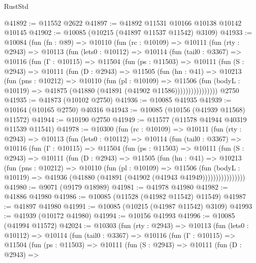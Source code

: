 \begin{lexlean}{RustStd}
\begin{coremodule}
@41892 := @11552 @2622
@41897 := @41892 @11531 @10166 @10138 @10142 @10145
@41902 := @10085 (@10215 (@41897 @11537 @11542) @3109)
@41933 := @10084
    (fun (fn : @89) =>
    @10110
      (fun (rc : @10109) =>
      @10111
        (fun (rty : @2943) =>
        @10113
          (fun (lets0 : @10112) =>
          @10114
            (fun (tail0 : @3367) =>
            @10116
              (fun (Γ : @10115) =>
              @11504
                (fun (ps : @11503) =>
                @10111
                  (fun (S : @2943) =>
                  @10111
                    (fun (D : @2943) =>
                    @11505
                      (fun (hn : @41) =>
                      @10213
                        (fun (pns : @10212) =>
                        @10110
                          (fun (pl : @10109) =>
                          @11506
                            (fun (bodyL : @10119) =>
                            @41875 (@41880 (@41891 (@41902 @11586))))))))))))))))
    @2750
@41935 := @41873 (@10102 @2750)
@41936 := @10085 @41935
@41939 := @10164 (@10165 @2750) @40316
@41943 := @10085 (@10156 (@41939 @11568) @11572)
@41944 := @10190 @2750
@41949 := @11577 (@11578 @41944 @40319 @11539 @11541)
@41978 := @10300
    (fun (rc : @10109) =>
    @10111
      (fun (rty : @2943) =>
      @10113
        (fun (lets0 : @10112) =>
        @10114
          (fun (tail0 : @3367) =>
          @10116
            (fun (Γ : @10115) =>
            @11504
              (fun (ps : @11503) =>
              @10111
                (fun (S : @2943) =>
                @10111
                  (fun (D : @2943) =>
                  @11505
                    (fun (hn : @41) =>
                    @10213
                      (fun (pns : @10212) =>
                      @10110
                        (fun (pl : @10109) =>
                        @11506
                          (fun (bodyL : @10119) =>
                          @41936 (@41880 (@41891 (@41902 (@41943 @41949))))))))))))))))
@41980 := @9071 (@9179 @18989)
@41981 := @41978 @41980
@41982 := @41886 @41980
@41986 := @10085 (@11528 (@41982 @11542) @11549)
@41987 := @41897 @41980
@41991 := @10085 (@10215 (@41987 @11542) @3109)
@41993 := @41939 (@10172 @41980)
@41994 := @10156 @41993
@41996 := @10085 (@41994 @11572)
@42024 := @10303
    (fun (rty : @2943) =>
    @10113
      (fun (lets0 : @10112) =>
      @10114
        (fun (tail0 : @3367) =>
        @10116
          (fun (Γ : @10115) =>
          @11504
            (fun (ps : @11503) =>
            @10111
              (fun (S : @2943) =>
              @10111
                (fun (D : @2943) =>

\end{coremodule}
\end{lexlean}
